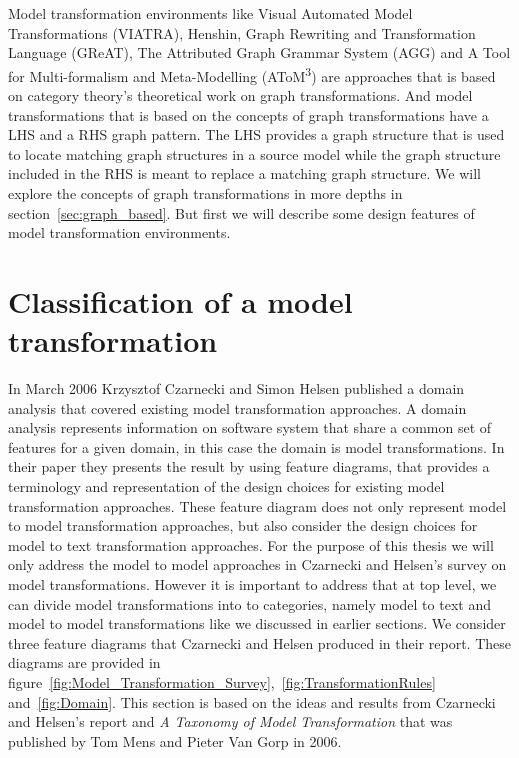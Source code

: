 Model transformation environments like Visual Automated Model
Transformations\cite{viatra2002} (VIATRA), Henshin\cite{Henshin_2010}, Graph
Rewriting and Transformation Language\cite{great2007} (GReAT), The Attributed
Graph Grammar System\cite{Taentzer2004} (AGG) and A Tool for Multi-formalism and
Meta-Modelling\cite{de2002atom3} (AToM\textsuperscript{3}) are approaches that
is based on category theory's theoretical work on graph transformations. And
model transformations that is based on the concepts of graph transformations
have a LHS and a RHS graph pattern. The LHS provides a graph structure that is
used to locate matching graph structures in a source model while the graph
structure included in the RHS is meant to replace a matching graph structure. We
will explore the concepts of graph transformations in more depths in
section~\ref{sec:graph_based}. But first we will describe some design features
of model transformation environments. 


\section{Classification of a model transformation}

In March 2006 Krzysztof Czarnecki and Simon Helsen published a domain analysis
that covered existing model transformation approaches\cite{Czarnecki2006}. A
domain analysis represents information on software system that share a common set of
features for a given domain\cite{FODA,Prieto-Diaz1990}, in this case the domain
is model transformations. In their paper they presents the result by using feature
diagrams, that provides a terminology and representation of the design choices
for existing model transformation approaches. These feature diagram does not
only represent model to model transformation approaches, but also consider the
design choices for model to text transformation approaches. For the purpose of
this thesis we will only address the model to model approaches in Czarnecki and
Helsen's survey on model transformations. However it is important to address
that at top level, we can divide model transformations into to categories,
namely model to text and model to model transformations like we discussed in
earlier sections. We consider three feature diagrams that Czarnecki and
Helsen produced in their report\cite{Czarnecki2006}. These diagrams are provided in
figure~\ref{fig:Model_Transformation_Survey},~\ref{fig:TransformationRules}
and~\ref{fig:Domain}. This section is based on the ideas and results from
Czarnecki and Helsen's report and \textit{A Taxonomy of Model
Transformation}\cite{Mens2006} that was published by Tom Mens and Pieter Van
Gorp in 2006.

